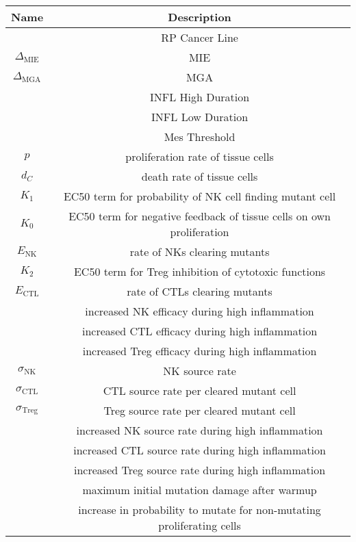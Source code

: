 \documentclass[11pt, a4paper, preprint]{article}
\begin{document}
\begin{center}
 \begin{longtable}{|| c | c||} 
 \hline
 Name & Description  \\ [0.5ex] 
 \hline\hline
  & RP Cancer Line   \\ 
 \hline
$\Delta_\text{MIE}$ &  MIE \\
 \hline
 $\Delta_\text{MGA}$ & MGA    \\
 \hline
&  INFL High Duration   \\
 \hline
 & INFL Low Duration    \\
 \hline
& Mes Threshold   \\
 \hline
 $p$ & proliferation rate of tissue cells \\ 
 \hline
 $d_C$  & death rate of tissue cells \\
 \hline
 $K_1$ & EC50 term for probability of NK cell finding mutant cell\\
 \hline
 $K_0$ & EC50 term for negative feedback of tissue cells on own proliferation\\
 \hline
 $E_\text{NK}$ & rate of NKs clearing mutants  \\
  \hline
  $K_2$ & EC50 term for Treg inhibition of cytotoxic functions  \\
  \hline
  $E_\text{CTL}$ & rate of CTLs clearing mutants \\
  \hline
  & increased NK efficacy during high inflammation  \\
  \hline
  & increased CTL efficacy during high inflammation  \\
  \hline
  & increased Treg efficacy during high inflammation  \\
  \hline
  $\sigma_\text{NK}$ & NK source rate \\ 
  \hline
  $\sigma_\text{CTL}$ & CTL source rate per cleared mutant cell \\ 
  \hline
  $\sigma_\text{Treg}$ & Treg source rate per cleared mutant cell \\ 
  \hline
   & increased NK source rate during high inflammation  \\
  \hline
   & increased CTL source rate during high inflammation  \\
  \hline
   & increased Treg source rate during high inflammation  \\
  \hline
  & maximum initial mutation damage after warmup  \\
  \hline
  & increase in probability to mutate for non-mutating proliferating cells  \\

\end{longtable}
\end{center}
\end{document}
